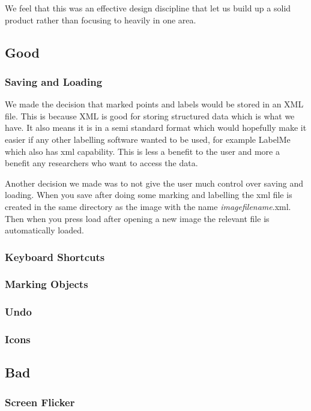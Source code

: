 \documentclass[a4paper,11pt,oneside]{article}
\begin{document}
We feel that this was an effective design discipline that let us build up a solid product rather than focusing to heavily in one area.

\subsection{Good}

\subsubsection{Saving and Loading}
We made the decision that marked points and labels would be stored in an XML file.  This is because XML is good for storing structured data which is what we have.  It also means it is in a semi standard format which would hopefully make it easier if any other labelling software wanted to be used, for example LabelMe which also has xml capability.  This is less a benefit to the user and more a benefit any researchers who want to access the data.

Another decision we made was to not give the user much control over saving and loading.  When you save after doing some marking and labelling the xml file is created in the same directory as the image with the name \emph{imagefilename}.xml.  Then when you press load after opening a new image the relevant file is automatically loaded.

\subsubsection{Keyboard Shortcuts}
\subsubsection{Marking Objects}
\subsubsection{Undo}
\subsubsection{Icons}

\subsection{Bad}
\subsubsection{Screen Flicker}
\end{document}
